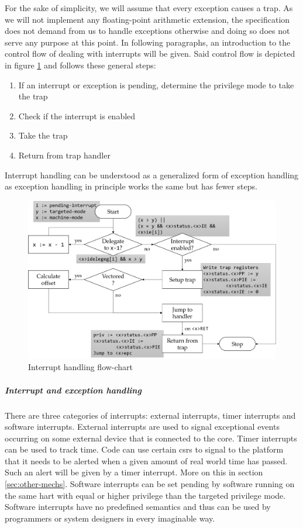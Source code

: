 For the sake of simplicity, we will assume that every exception causes a trap.
As we will not implement any floating-point arithmetic extension, the specification does not demand from us to handle exceptions otherwise and doing so does not serve any purpose at this point.
In following paragraphs, an introduction to the control flow of dealing with interrupts will be given.
Said control flow is depicted in figure \ref{fig:interrupt-handling} and follows these general steps:
\begin{enumerate}
    \item If an interrupt or exception is pending, determine the privilege mode to take the trap
    \item Check if the interrupt is enabled
    \item Take the trap
    \item Return from trap handler
\end{enumerate}
Interrupt handling can be understood as a generalized form of exception handling as exception handling in principle works the same but has fewer steps.

\begin{figure}
    \centering
    \includegraphics[width=\textwidth]{figures/interrupt-handling.png}
    \caption{Interrupt handling flow-chart}
    \label{fig:interrupt-handling}
\end{figure}

\subparagraph{Interrupt and exception handling}
There are three categories of interrupts: external interrupts, timer interrupts and software interrupts.
External interrupts are used to signal exceptional events occurring on some external device that is connected to the core.
Timer interrupts can be used to track time.
Code can use certain \glspl{csr} to signal to the platform that it needs to be alerted when a given amount of real world time has passed.
Such an alert will be given by a timer interrupt.
More on this in section \ref{sec:other-mechs}.
Software interrupts can be set pending by software running on the same \gls{hart} with equal or higher privilege than the targeted privilege mode.
Software interrupts have no predefined semantics and thus can be used by programmers or system designers in every imaginable way.

